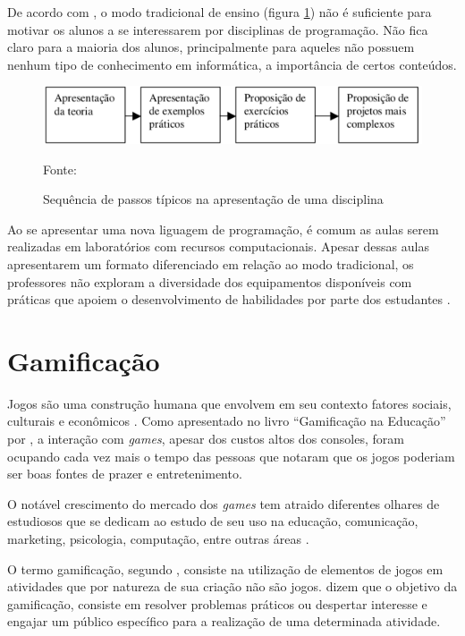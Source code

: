 De acordo com , o modo tradicional de ensino (figura \ref{figura4}) não é suficiente para motivar os alunos a se
interessarem por disciplinas de programação. Não fica claro para a maioria dos alunos, principalmente para aqueles
não possuem nenhum tipo de conhecimento em informática, a importância de certos conteúdos.

\begin{figure}[h]
	\centering
	\includegraphics[keepaspectratio=true,scale=0.34]{figuras/modoTradicional.png}
	\caption{Sequência de passos típicos na apresentação de uma disciplina}
	Fonte: \cite{Borges}
	\label{figura4}
\end{figure}

Ao se apresentar uma nova liguagem de programação, é comum as aulas serem realizadas em laboratórios com
recursos computacionais. Apesar dessas aulas apresentarem um formato diferenciado em relação ao modo tradicional,
os professores não exploram a diversidade dos equipamentos disponíveis com práticas que apoiem o desenvolvimento 
de habilidades por parte dos estudantes \cite{Borges}.

\section{Gamificação}
Jogos são uma construção humana que envolvem em seu contexto fatores sociais, culturais e econômicos \cite{EaDF440}.
Como apresentado no livro ``Gamificação na Educação'' por , a interação com \textit{games}, apesar
dos custos altos dos consoles, foram ocupando cada vez mais o tempo das pessoas que notaram que os jogos poderiam ser boas fontes
de prazer e entretenimento.

O notável crescimento do mercado dos \textit{games} tem atraido diferentes olhares de estudiosos que se dedicam ao estudo de seu
uso na educação, comunicação, marketing, psicologia, computação, entre outras áreas \cite{da2014gamificaccao}.

O termo gamificação, segundo , consiste na utilização de elementos de jogos em 
atividades que por natureza de sua criação não são jogos.  dizem que o objetivo da gamificação, consiste em resolver
problemas práticos ou despertar interesse e engajar um público específico para a realização de uma determinada
atividade. 

